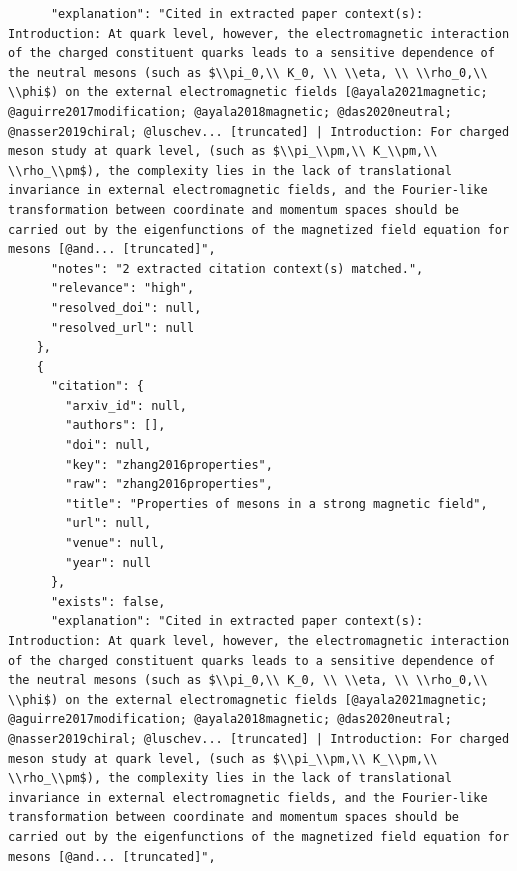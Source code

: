 \documentclass[11pt]{article}
\begin{document}
\begin{verbatim}
      "explanation": "Cited in extracted paper context(s): Introduction: At quark level, however, the electromagnetic interaction of the charged constituent quarks leads to a sensitive dependence of the neutral mesons (such as $\\pi_0,\\ K_0, \\ \\eta, \\ \\rho_0,\\ \\phi$) on the external electromagnetic fields [@ayala2021magnetic; @aguirre2017modification; @ayala2018magnetic; @das2020neutral; @nasser2019chiral; @luschev... [truncated] | Introduction: For charged meson study at quark level, (such as $\\pi_\\pm,\\ K_\\pm,\\ \\rho_\\pm$), the complexity lies in the lack of translational invariance in external electromagnetic fields, and the Fourier-like transformation between coordinate and momentum spaces should be carried out by the eigenfunctions of the magnetized field equation for mesons [@and... [truncated]",
      "notes": "2 extracted citation context(s) matched.",
      "relevance": "high",
      "resolved_doi": null,
      "resolved_url": null
    },
    {
      "citation": {
        "arxiv_id": null,
        "authors": [],
        "doi": null,
        "key": "zhang2016properties",
        "raw": "zhang2016properties",
        "title": "Properties of mesons in a strong magnetic field",
        "url": null,
        "venue": null,
        "year": null
      },
      "exists": false,
      "explanation": "Cited in extracted paper context(s): Introduction: At quark level, however, the electromagnetic interaction of the charged constituent quarks leads to a sensitive dependence of the neutral mesons (such as $\\pi_0,\\ K_0, \\ \\eta, \\ \\rho_0,\\ \\phi$) on the external electromagnetic fields [@ayala2021magnetic; @aguirre2017modification; @ayala2018magnetic; @das2020neutral; @nasser2019chiral; @luschev... [truncated] | Introduction: For charged meson study at quark level, (such as $\\pi_\\pm,\\ K_\\pm,\\ \\rho_\\pm$), the complexity lies in the lack of translational invariance in external electromagnetic fields, and the Fourier-like transformation between coordinate and momentum spaces should be carried out by the eigenfunctions of the magnetized field equation for mesons [@and... [truncated]",

\end{verbatim}
\end{document}
